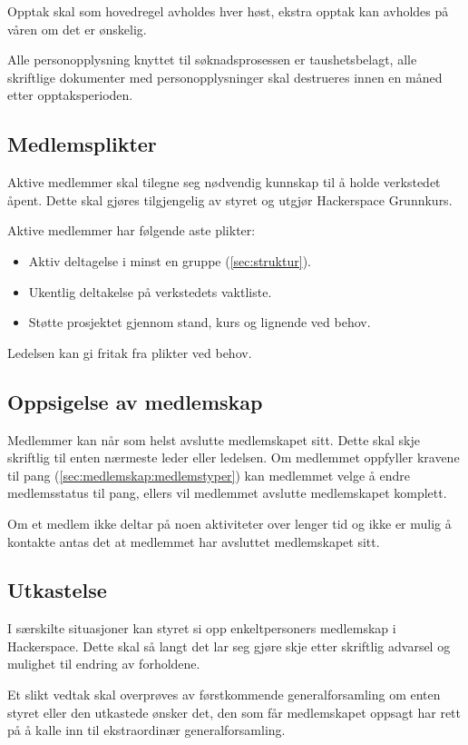 Opptak skal som hovedregel avholdes hver høst, ekstra opptak kan avholdes på våren om det er ønskelig.
 
Alle personopplysning knyttet til søknadsprosessen er taushetsbelagt, alle skriftlige dokumenter med personopplysninger skal destrueres innen en måned etter opptaksperioden.

\subsection{Medlemsplikter}\label{sec:medlemskap:medlemsplikter}
Aktive medlemmer skal tilegne seg nødvendig kunnskap til å holde verkstedet åpent.
Dette skal gjøres tilgjengelig av styret og utgjør Hackerspace Grunnkurs.

Aktive medlemmer har følgende aste plikter:
\begin{itemize}
\item Aktiv deltagelse i minst en gruppe (\ref{sec:struktur}).
\item Ukentlig deltakelse på verkstedets vaktliste.
\item Støtte prosjektet gjennom stand, kurs og lignende ved behov.
\end{itemize}
Ledelsen kan gi fritak fra plikter ved behov.
        
\subsection{Oppsigelse av medlemskap}\label{sec:medlemskap:oppsigelse}
Medlemmer kan når som helst avslutte medlemskapet sitt.
Dette skal skje skriftlig til enten nærmeste leder eller ledelsen.
Om medlemmet oppfyller kravene til pang (\ref{sec:medlemskap:medlemstyper}) kan medlemmet velge å endre medlemsstatus til pang, ellers vil medlemmet avslutte medlemskapet komplett.

Om et medlem ikke deltar på noen aktiviteter over lenger tid og ikke er mulig å kontakte antas det at medlemmet har avsluttet medlemskapet sitt.

\subsection{Utkastelse}\label{sec:medlemskap:utkastelse}
I særskilte situasjoner kan styret si opp enkeltpersoners medlemskap i Hackerspace.
Dette skal så langt det lar seg gjøre skje etter skriftlig advarsel og mulighet til endring av forholdene.

Et slikt vedtak skal overprøves av førstkommende generalforsamling om enten styret eller den utkastede ønsker det, den som får medlemskapet oppsagt har rett på å kalle inn til ekstraordinær generalforsamling.


